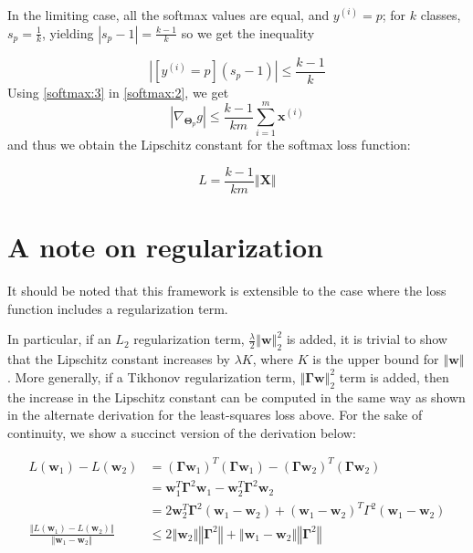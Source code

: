 \documentclass{article}
\begin{document}
In the limiting case, all the softmax values are equal, and $y^{(i)} = p$; for $k$ classes, $s_p = \frac{1}{k}$, yielding $|s_p-1| = \frac{k-1}{k}$ so we get the inequality

\begin{equation}
    |[y^{(i)} = p](s_p-1)| \leq \frac{k-1}{k} \label{softmax:3}
\end{equation}
Using \eqref{softmax:3} in \eqref{softmax:2}, we get
\[
    |\nabla_{\boldsymbol\Theta_p} g| \leq \frac{k-1}{km} \sum\limits_{i=1}^m \textbf{x}^{(i)}
\]
and thus we obtain the Lipschitz constant for the softmax loss function:

\[
    \boxed{
        L = \frac{k-1}{km}\left\Vert \textbf{X} \right\Vert
    }
\]

\section{A note on regularization} \label{regularization}
It should be noted that this framework is extensible to the case where the loss function includes a regularization term. 

In particular, if an $L_2$ regularization term, $\frac{\lambda}{2}\left\Vert \textbf{w} \right\Vert_2^2$ is added, it is trivial to show that the Lipschitz constant increases by $\lambda K$, where $K$ is the upper bound for $\left\Vert \textbf{w} \right\Vert$. More generally, if a Tikhonov regularization term, $\left\Vert \boldsymbol\Gamma \textbf{w} \right\Vert_2^2$ term is added, then the increase in the Lipschitz constant can be computed in the same way as shown in the alternate derivation for the least-squares loss above. For the sake of continuity, we show a succinct version of the derivation below:

\[
    \begin{aligned}
        L(\textbf{w}_1) - L(\textbf{w}_2) &= (\boldsymbol\Gamma \textbf{w}_1)^T (\boldsymbol\Gamma \textbf{w}_1) - (\boldsymbol\Gamma \textbf{w}_2)^T (\boldsymbol\Gamma \textbf{w}_2) \\
        &= \textbf{w}_1^T \boldsymbol\Gamma^2 \textbf{w}_1 - \textbf{w}_2^T \boldsymbol\Gamma^2 \textbf{w}_2 \\
        &= 2\textbf{w}_2^T \boldsymbol\Gamma^2 (\textbf{w}_1 - \textbf{w}_2) + (\textbf{w}_1-\textbf{w}_2)^T \Gamma^2 (\textbf{w}_1-\textbf{w}_2) \\
        \frac{\left\Vert L(\textbf{w}_1) - L(\textbf{w}_2) \right\Vert}{\left\Vert \textbf{w}_1-\textbf{w}_2 \right\Vert} & \leq 2 \left\Vert \textbf{w}_2 \right\Vert \left\Vert \boldsymbol\Gamma^2 \right\Vert + \left\Vert \textbf{w}_1-\textbf{w}_2 \right\Vert \left\Vert \boldsymbol\Gamma^2 \right\Vert 
    \end{aligned}
\]
\end{document}
